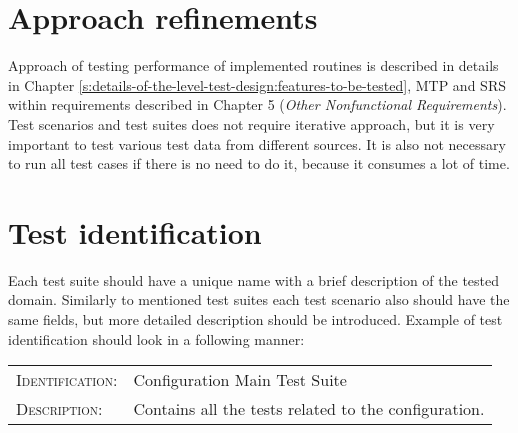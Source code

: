 \section{Approach refinements} \label{s:details-of-the-level-test-design:approach-refinements}
	\begin{comment}
		Specify refinements to the approach described in the corresponding Level Test Plan (if there is one;
		otherwise specify the entire approach). Include specific test techniques to be used. The method of
		analyzing test results should be identified (e.g., comparator tools, visual inspection, etc.).
		Summarize the common attributes of any test cases. This may include input constraints that must be
		true for every input in a set of associated test cases, any shared environmental needs, any shared
		special procedural requirements, and any shared case dependencies. Sets of associated test cases may
		be identified as scenarios (also commonly called scripts or suites). Test scenarios should be designed to
		be as reusable as possible for regression testing, revalidation testing for changes, and training new
		employees who must either use or support the system over time.
	\end{comment}
	Approach of testing performance of implemented routines is described in details in Chapter \ref{s:details-of-the-level-test-design:features-to-be-tested}, \gls{MTP} and \gls{SRS} within requirements described in Chapter 5 (\emph{Other Nonfunctional Requirements}). Test scenarios and test suites does not require iterative approach, but it is very important to test various test data from different sources. It is also not necessary to run all test cases if there is no need to do it, because it consumes a lot of time.
\section{Test identification} \label{s:details-of-the-level-test-design:test-identification}
	\begin{comment}
		List the identifier and a brief description of each test case (or set of related test cases) in scenarios for
		this design. A particular test case, scenario, or procedure may be identified in more than one LTD. List
		the identifier and a brief description of each procedure associated with this LTD.
	\end{comment}
	Each test suite should have a unique name with a brief description of the tested domain. Similarly to mentioned test suites each test scenario also should have the same fields, but more detailed description should be introduced. Example of test identification should look in a following manner: \\
	\begin{center}
		\boxed
		{
			\begin{tabular}{ll}
				\textsc{Identification:} & Configuration Main Test Suite \\
				\textsc{Description:} & Contains all the tests related to the configuration.
			\end{tabular}
		}
	\end{center}
